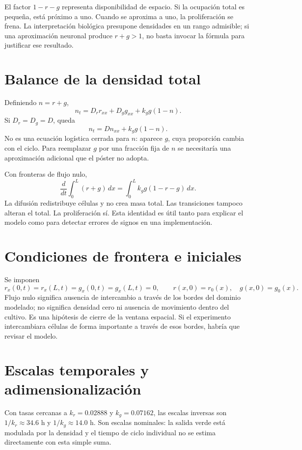 \documentclass[11pt,a4paper]{report}
\begin{document}
El factor $1-r-g$ representa disponibilidad de espacio. Si la ocupación total es pequeña, está próximo a uno. Cuando se aproxima a uno, la proliferación se frena. La interpretación biológica presupone densidades en un rango admisible; si una aproximación neuronal produce $r+g>1$, no basta invocar la fórmula para justificar ese resultado.

\section{Balance de la densidad total}
Definiendo $n=r+g$,
\begin{equation}
n_t=D_rr_{xx}+D_gg_{xx}+k_gg(1-n).
\end{equation}
Si $D_r=D_g=D$, queda
\begin{equation}
n_t=Dn_{xx}+k_gg(1-n).\label{eq:total}
\end{equation}
No es una ecuación logística cerrada para $n$: aparece $g$, cuya proporción cambia con el ciclo. Para reemplazar $g$ por una fracción fija de $n$ se necesitaría una aproximación adicional que el póster no adopta.

Con fronteras de flujo nulo,
\begin{equation}
\frac{d}{dt}\int_0^L(r+g)\,dx=\int_0^L k_gg(1-r-g)\,dx.
\end{equation}
La difusión redistribuye células y no crea masa total. Las transiciones tampoco alteran el total. La proliferación sí. Esta identidad es útil tanto para explicar el modelo como para detectar errores de signos en una implementación.

\section{Condiciones de frontera e iniciales}
Se imponen
\[
r_x(0,t)=r_x(L,t)=g_x(0,t)=g_x(L,t)=0,
\qquad r(x,0)=r_0(x),\quad g(x,0)=g_0(x).
\]
Flujo nulo significa ausencia de intercambio a través de los bordes del dominio modelado; no significa densidad cero ni ausencia de movimiento dentro del cultivo. Es una hipótesis de cierre de la ventana espacial. Si el experimento intercambiara células de forma importante a través de esos bordes, habría que revisar el modelo.

\section{Escalas temporales y adimensionalización}
Con tasas cercanas a $k_r=0.02888$ y $k_g=0.07162$, las escalas inversas son $1/k_r\approx34.6$ h y $1/k_g\approx14.0$ h. Son escalas nominales: la salida verde está modulada por la densidad y el tiempo de ciclo individual no se estima directamente con esta simple suma.
\end{document}
